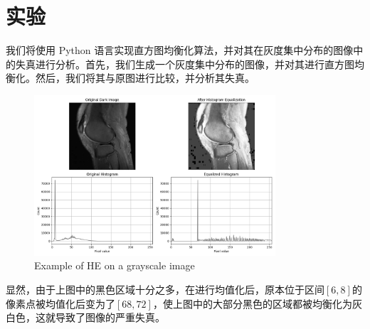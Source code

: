 \documentclass{ctexart}
\begin{document}
\section{实验}
   我们将使用 Python 语言实现直方图均衡化算法，并对其在灰度集中分布的图像中的失真进行分析。首先，我们生成一个灰度集中分布的图像，并对其进行直方图均衡化。然后，我们将其与原图进行比较，并分析其失真。
\begin{figure}[http]
        \centering
      
    \includegraphics[width=0.8\textwidth]{Figure_1.png}
       \caption{Example of HE on a grayscale image}
    \end{figure}
   
显然，由于上图中的黑色区域十分之多，在进行均值化后，原本位于区间$[6,8]$的像素点被均值化后变为了$[68,72]$，使上图中的大部分黑色的区域都被均衡化为灰白色，这就导致了图像的严重失真。
\end{document}
